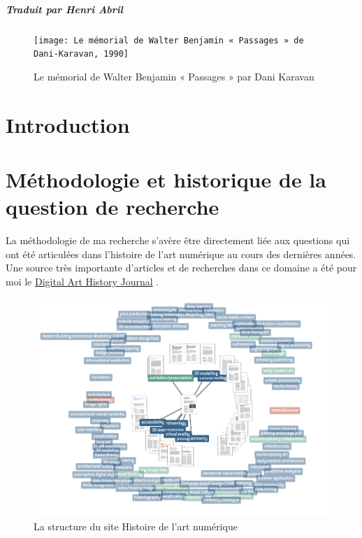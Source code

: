 \documentclass[a4paper, twoside, 12pt]{book}
\begin{document}
\paragraph{Traduit par Henri Abril\\}

\begin{figure}
    \centering
    \texttt{[image: Le mémorial de Walter Benjamin « Passages » de Dani-Karavan, 1990]}
    \caption{Le mémorial de Walter Benjamin « Passages » par Dani Karavan}
    \label{fig:label}
\end{figure}

\tableofcontents

\clearpage

\mainmatter







\chapter{Introduction}



\chapter{Méthodologie et historique de la question de recherche}

La méthodologie de ma recherche s'avère être directement liée aux questions qui ont été articulées dans l'histoire de l'art numérique au cours des dernières années. Une source très importante d'articles et de recherches dans ce domaine a été pour moi le \hyperlink{https://dahj.org}{Digital Art History Journal} .\\

\begin{figure}
    \centering
    \includegraphics[width=1\linewidth]{Screenshot 2023-06-07 at 12.05.47.png}
    \caption{La structure du site Histoire de l'art numérique}
    \label{fig:enter-label}
\end{figure}
\end{document}
